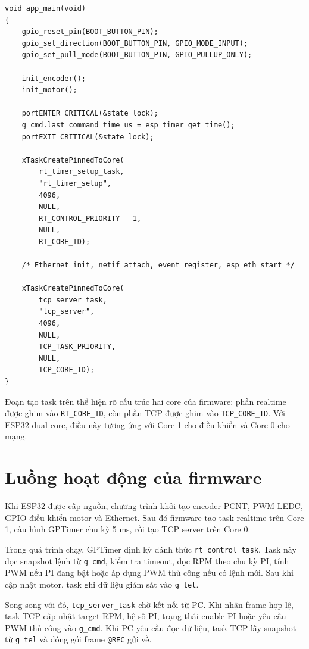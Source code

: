 \documentclass[12pt,a4paper]{report}
\begin{document}
\begin{lstlisting}
void app_main(void)
{
    gpio_reset_pin(BOOT_BUTTON_PIN);
    gpio_set_direction(BOOT_BUTTON_PIN, GPIO_MODE_INPUT);
    gpio_set_pull_mode(BOOT_BUTTON_PIN, GPIO_PULLUP_ONLY);

    init_encoder();
    init_motor();

    portENTER_CRITICAL(&state_lock);
    g_cmd.last_command_time_us = esp_timer_get_time();
    portEXIT_CRITICAL(&state_lock);

    xTaskCreatePinnedToCore(
        rt_timer_setup_task,
        "rt_timer_setup",
        4096,
        NULL,
        RT_CONTROL_PRIORITY - 1,
        NULL,
        RT_CORE_ID);

    /* Ethernet init, netif attach, event register, esp_eth_start */

    xTaskCreatePinnedToCore(
        tcp_server_task,
        "tcp_server",
        4096,
        NULL,
        TCP_TASK_PRIORITY,
        NULL,
        TCP_CORE_ID);
}
\end{lstlisting}

Đoạn tạo task trên thể hiện rõ cấu trúc hai core của firmware: phần realtime được ghim vào \texttt{RT\_CORE\_ID}, còn phần TCP được ghim vào \texttt{TCP\_CORE\_ID}. Với ESP32 dual-core, điều này tương ứng với Core 1 cho điều khiển và Core 0 cho mạng.

\section{Luồng hoạt động của firmware}

Khi ESP32 được cấp nguồn, chương trình khởi tạo encoder PCNT, PWM LEDC, GPIO điều khiển motor và Ethernet. Sau đó firmware tạo task realtime trên Core 1, cấu hình GPTimer chu kỳ 5 ms, rồi tạo TCP server trên Core 0.

Trong quá trình chạy, GPTimer định kỳ đánh thức \texttt{rt\_control\_task}. Task này đọc snapshot lệnh từ \texttt{g\_cmd}, kiểm tra timeout, đọc RPM theo chu kỳ PI, tính PWM nếu PI đang bật hoặc áp dụng PWM thủ công nếu có lệnh mới. Sau khi cập nhật motor, task ghi dữ liệu giám sát vào \texttt{g\_tel}.

Song song với đó, \texttt{tcp\_server\_task} chờ kết nối từ PC. Khi nhận frame hợp lệ, task TCP cập nhật target RPM, hệ số PI, trạng thái enable PI hoặc yêu cầu PWM thủ công vào \texttt{g\_cmd}. Khi PC yêu cầu đọc dữ liệu, task TCP lấy snapshot từ \texttt{g\_tel} và đóng gói frame \texttt{@REC} gửi về.
\end{document}
